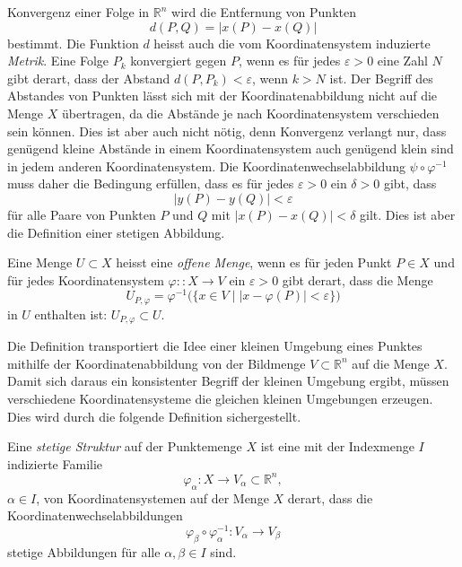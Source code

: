 Konvergenz einer Folge in $\mathbb{R}^n$ wird die Entfernung von Punkten 
\[
d(P,Q)
=
|x(P)-x(Q)|
\]
bestimmt.
Die Funktion $d$ heisst auch die vom Koordinatensystem induzierte 
{\em Metrik}.
%
Eine Folge $P_k$ konvergiert gegen $P$, wenn es für jedes $\varepsilon>0$
eine Zahl $N$ gibt derart, dass der Abstand $d(P,P_k)<\varepsilon$, wenn
$k>N$ ist.
Der Begriff des Abstandes von Punkten lässt sich mit der Koordinatenabbildung
nicht auf die Menge $X$ übertragen, da die Abstände je nach Koordinatensystem
verschieden sein können.
Dies ist aber auch nicht nötig, denn Konvergenz verlangt nur, dass genügend
kleine Abstände in einem Koordinatensystem auch genügend klein sind in jedem
anderen Koordinatensystem.
Die Koordinatenwechselabbildung $\psi\circ\varphi^{-1}$  muss daher die
Bedingung erfüllen, dass es für jedes $\varepsilon>0$ ein $\delta>0$ gibt,
dass 
\[
|y(P)-y(Q)| < \varepsilon
\]
für alle Paare von Punkten $P$ und $Q$ mit $|x(P)-x(Q)| < \delta$
gilt.
Dies ist aber die Definition einer stetigen Abbildung.

\begin{definition}
\label{buch:koordinaten:koordinaten:definition:offenemenge}
Eine Menge $U\subset X$ heisst eine {\em offene Menge}, wenn es für jeden Punkt
%
%
$P\in X$ und für jedes Koordinatensystem $\varphi:\colon X\to V$
ein $\varepsilon >0$ gibt derart, dass die Menge
\[
U_{P,\varphi}
=
\varphi^{-1}\bigl(
\{
x\in V
\mid
|x-\varphi(P)|<\varepsilon
\}
\bigr)
\]
in $U$ enthalten ist: $U_{P,\varphi}\subset U$.
\end{definition}

Die Definition transportiert die Idee einer kleinen Umgebung
eines Punktes mithilfe der Koordinatenabbildung von der Bildmenge
$V\subset \mathbb{R}^n$ auf die Menge $X$.
Damit sich daraus ein konsistenter Begriff der kleinen Umgebung 
ergibt, müssen verschiedene Koordinatensysteme die gleichen
kleinen Umgebungen erzeugen.
Dies wird durch die folgende Definition sichergestellt.

\begin{definition}
\label{buch:koordinaten:koordinaten:definition:stetigestruktur}
%
%
Eine {\em stetige Struktur} auf der Punktemenge $X$ ist eine mit
der Indexmenge $I$ indizierte Familie
\[
\varphi_\alpha\colon X\to V_\alpha \subset \mathbb{R}^n,
\]
$\alpha\in I$,
von Koordinatensystemen auf der Menge $X$ derart, dass die
Koordinatenwechselabbildungen
\[
\varphi_{\beta}\circ\varphi_\alpha^{-1}
\colon
V_\alpha \to V_\beta
\]
stetige Abbildungen für alle $\alpha,\beta\in I$ sind.
\end{definition}


